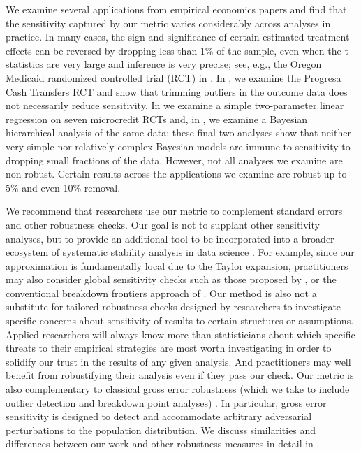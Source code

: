 We examine several applications from empirical economics papers and find that
the sensitivity captured by our metric varies considerably across analyses in
practice. In many cases, the sign and significance of certain estimated
treatment effects can be reversed by dropping less than 1\% of the sample, even
when the t-statistics are very large and inference is very precise; see, e.g.,
the Oregon Medicaid randomized controlled trial (RCT) \citep{finkelstein2012oregon} in
. In , we examine the
Progresa Cash Transfers RCT \citep{angelucci2009indirect} and show that trimming
outliers in the outcome data does not necessarily reduce sensitivity. In
 we examine a simple two-parameter
linear regression on seven microcredit RCTs \citep{meager2020aggregating} and,
in , we examine a Bayesian hierarchical
analysis of the same data; these final two analyses show
that neither very simple nor relatively complex Bayesian models are immune to
sensitivity to dropping small fractions of the data.  However, not all analyses
we examine are non-robust.  Certain results across the applications we examine
are robust up to 5\% and even 10\% removal.

We recommend that researchers use our metric to complement standard errors and
other robustness checks. Our goal is not to supplant other sensitivity analyses,
but to provide an additional tool to be incorporated into a broader ecosystem of
systematic stability analysis in data science \citep{yu:2013:stability}. For
example, since our approximation is fundamentally local due to the Taylor
expansion, practitioners may also consider global sensitivity checks such as
those proposed by \citet{leamer1984global, leamer1985sensitivity,
sobol2001global,saltelli2004global}, or the conventional breakdown frontiers
approach of \citet{he1990tail, masten2020inference}.
%
Our method is also not a substitute for tailored robustness checks designed by
researchers to investigate specific concerns about sensitivity of results to
certain structures or assumptions. Applied researchers will always know more
than statisticians about which specific threats to their empirical strategies
are most worth investigating in order to solidify our trust in the results of
any given analysis.  And practitioners may well benefit from robustifying their
analysis \citep{mostellertukeydata, hansen2008robustness,chen2011sensitivity}
even if they pass our check.  Our metric is also complementary to classical
gross error robustness (which we take to include outlier detection and breakdown
point analyses) \citep{belsley:1980:regression,hampel1986robustbook}. In
particular, gross error sensitivity is designed to detect and accommodate
arbitrary adversarial perturbations to the population distribution.
We discuss similarities and differences between our work and other
robustness measures in detail in .

